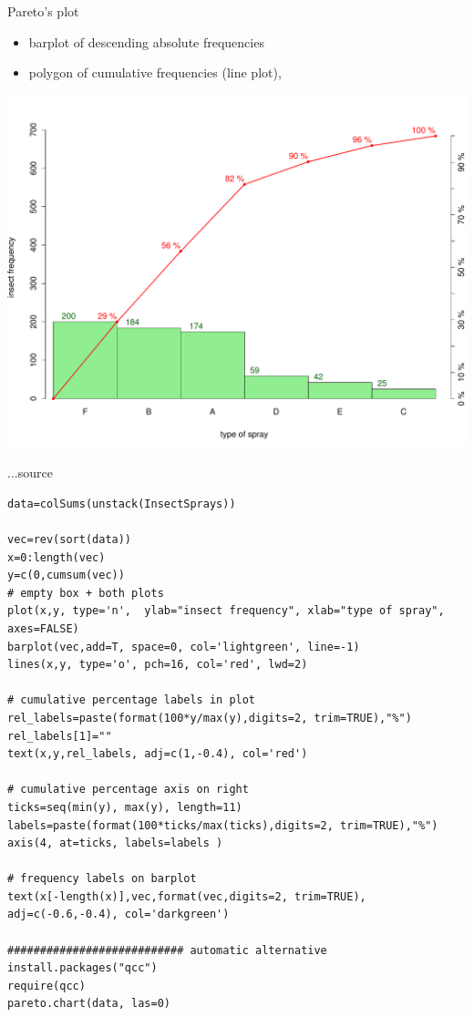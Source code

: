 \documentclass[smaller, hyperref={colorlinks=true}]{beamer}
\begin{document}
   

\begin{frame}{Pareto's plot}
\begin{itemize}
\item barplot of descending absolute frequencies
\item polygon of cumulative frequencies (line plot),\\
\end{itemize}
\includegraphics[scale=0.32]{01_pareto.pdf} 
\end{frame}

\begin{frame}[fragile]{...source}
\begin{Verbatim}[fontsize=\scriptsize]
data=colSums(unstack(InsectSprays))

vec=rev(sort(data))
x=0:length(vec)
y=c(0,cumsum(vec))
# empty box + both plots
plot(x,y, type='n',  ylab="insect frequency", xlab="type of spray", axes=FALSE)
barplot(vec,add=T, space=0, col='lightgreen', line=-1)
lines(x,y, type='o', pch=16, col='red', lwd=2)

# cumulative percentage labels in plot
rel_labels=paste(format(100*y/max(y),digits=2, trim=TRUE),"%")
rel_labels[1]=""
text(x,y,rel_labels, adj=c(1,-0.4), col='red')

# cumulative percentage axis on right
ticks=seq(min(y), max(y), length=11)
labels=paste(format(100*ticks/max(ticks),digits=2, trim=TRUE),"%")
axis(4, at=ticks, labels=labels )

# frequency labels on barplot
text(x[-length(x)],vec,format(vec,digits=2, trim=TRUE), adj=c(-0.6,-0.4), col='darkgreen')

########################### automatic alternative
install.packages("qcc")
require(qcc)
pareto.chart(data, las=0)
\end{Verbatim}
\end{frame}
\end{document}
